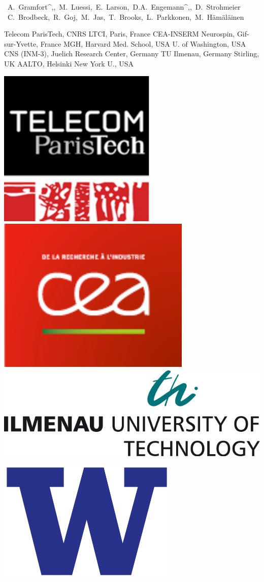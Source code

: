 \documentclass[t,11pt,compress]{beamer} %
\def\name#1{\mbox{\sc #1}}
\begin{document}
\begin{frame}[plain,t,c]
{    \begin{center}
    \mbox{\hspace{-1em}%
    \name{A. Gramfort\PARISTECH^{,}\NSPIN, M. Luessi\MGH, E. Larson\UW, D.A.        
	      Engemann\NSPIN^{,}\JUELICH, D. Strohmeier\ILMENAU}}
    \mbox{\hspace{-1em}%
    \name{C. Brodbeck\NYU, R. Goj\STIRLING, M. Jas\AALTO, T. Brooks\NYU, L. Parkkonen\AALTO, M. H\"am\"al\"ainen\MGH}}
	\vspace{0.05cm}
	\def\affilbr{\hspace{0.2cm}}
    \parbox{13cm}{\tiny\center
                 \PARISTECH Telecom ParisTech, CNRS LTCI, Paris, France \affilbr
                 \NSPIN CEA-INSERM Neurospin, Gif-sur-Yvette, France \affilbr
                 \MGH MGH, Harvard Med. School, USA \affilbr
                 \UW U. of Washington, USA\\
                 \JUELICH CNS (INM-3), Juelich Research Center, Germany \affilbr
                 \ILMENAU TU Ilmenau, Germany \affilbr
                 \STIRLING Stirling, UK \affilbr
                 \AALTO AALTO, Helsinki \affilbr
                 \NYU New York U., USA}
    \end{center}
}
%
\hfill
%
\begin{minipage}{0.15\linewidth}
    \vspace{1ex}
    \hfill
    \centerline{%
    \includegraphics[width=0.188\linewidth]{logo_telecom}
    \,
    \includegraphics[width=0.233\linewidth]{logo_cea}
    \,
    \includegraphics[width=0.45\linewidth]{logo_tuil}
    }
    \centerline{%
    \includegraphics[width=0.24\linewidth]{logo_uw}
}
\end{minipage}
\end{frame}
\end{document}
